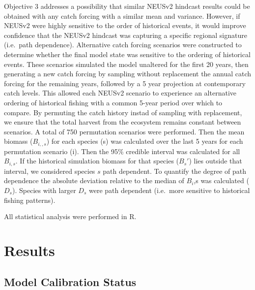 \documentclass[
]{article}
\begin{document}
Objective 3 addresses a possibility that similar NEUSv2 hindcast results could be obtained with any catch forcing with a similar mean and variance. However, if NEUSv2 were highly sensitive to the order of historical events, it would improve confidence that the NEUSv2 hindcast was capturing a specific regional signature (i.e.~path dependence). Alternative catch forcing scenarios were constructed to determine whether the final model state was sensitive to the ordering of historical events. These scenarios simulated the model unaltered for the first 20 years, then generating a new catch forcing by sampling without replacement the annual catch forcing for the remaining years, followed by a 5 year projection at contemporary catch levels. This allowed each NEUSv2 scenario to experience an alternative ordering of historical fishing with a common 5-year period over which to compare. By permuting the catch history instad of sampling with replacement, we ensure that the total harvest from the ecosystem remains constant between scenarios. A total of 750 permutation scenarios were performed. Then the mean biomass (\(B_{i,,s}\)) for each species (s) was calculated over the last 5 years for each permutation scenario (i). Then the 95\% credible interval was calculated for all \(B_{i,s}\). If the historical simulation biomass for that species (\(B_{s}'\)) lies outside that interval, we considered species \(s\) path dependent. To quantify the degree of path dependence the absolute deviation relative to the median of \(B_i\),s was calculated (\(D_s\)). Species with larger \(D_s\) were path dependent (i.e.~more sensitive to historical fishing patterns).

All statistical analysis were performed in R.

\section{Results}\label{results}

\subsection{Model Calibration Status}\label{model-calibration-status}
\end{document}
